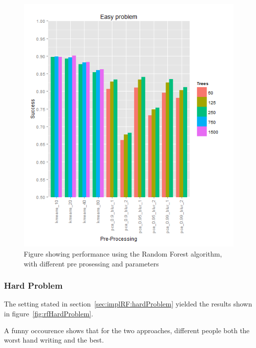 \documentclass[report]{subfiles}
\begin{document}
\begin{figure}[H]
  \centering
  \includegraphics[width=1\textwidth]{images/rf_easy}
  \caption{Figure showing performance using the Random Forest algorithm, with different pre prosessing and parameters}
  \label{fig:rfEasyProblem}
\end{figure}

\subsubsection{Hard Problem}

The setting stated in section~\ref{sec:implRF:hardProblem} yielded the results shown in figure~\ref{fig:rfHardProblem}. 

A funny occourence shows that for the two approaches, different people both the worst hand writing and the best.
\end{document}
